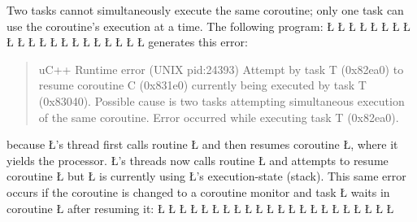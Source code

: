 \documentclass[openright,twoside]{report}
\begin{document}
Two tasks cannot simultaneously execute the same coroutine;
only one task can use the coroutine's execution at a time.
The following program:
\LGinlinefalse\LGbegin\lgrinde
\L{}
\L{\LB{}}
\L{\LB{}}
\L{\LB{}}
\L{}
\L{\LB{}}
\L{\LB{}}
\L{\LB{}}
\L{\LB{\};}}
\endlgrinde\LGend
\LGinlinefalse\LGbegin\lgrinde
\L{}
\L{\LB{}}
\L{\LB{}}
\L{\LB{}}
\L{\LB{}}
\L{}
\L{\LB{}}
\L{\LB{\};}}
\L{}
\L{\LB{}}
\L{\LB{}}
\L{\LB{\}}}
\endlgrinde\LGend
generates this error:
\begin{quote}
\BGfont
uC++ Runtime error (UNIX pid:24393) Attempt by task T (0x82ea0) to resume coroutine C (0x831e0) currently being executed by task T (0x83040).
Possible cause is two tasks attempting simultaneous execution of the same coroutine.
Error occurred while executing task T (0x82ea0).
\end{quote}
because \LGinlinetrue\LGbegin\lgrinde\L{}\endlgrinde\LGend{}'s thread first calls routine \LGinlinetrue\LGbegin\lgrinde\L{}\endlgrinde\LGend{} and then resumes coroutine \LGinlinetrue\LGbegin\lgrinde\L{}\endlgrinde\LGend{}, where it yields the processor.
\LGinlinetrue\LGbegin\lgrinde\L{}\endlgrinde\LGend{}'s threads now calls routine \LGinlinetrue\LGbegin\lgrinde\L{}\endlgrinde\LGend{} and attempts to resume coroutine \LGinlinetrue\LGbegin\lgrinde\L{}\endlgrinde\LGend{} but \LGinlinetrue\LGbegin\lgrinde\L{}\endlgrinde\LGend{} is currently using \LGinlinetrue\LGbegin\lgrinde\L{}\endlgrinde\LGend{}'s execution-state (stack).
This same error occurs if the coroutine is changed to a coroutine monitor and task \LGinlinetrue\LGbegin\lgrinde\L{}\endlgrinde\LGend{} waits in coroutine \LGinlinetrue\LGbegin\lgrinde\L{}\endlgrinde\LGend{} after resuming it:
\LGinlinefalse\LGbegin\lgrinde
\L{}
\L{\LB{}}
\L{\LB{}}
\L{\LB{}}
\L{\LB{}}
\L{}
\L{\LB{}}
\L{\LB{}}
\L{\LB{}}
\L{\LB{\};}}
\endlgrinde\LGend
\LGinlinefalse\LGbegin\lgrinde
\L{}
\L{\LB{}}
\L{\LB{}}
\L{\LB{}}
\L{\LB{}}
\L{}
\L{\LB{}}
\L{\LB{\};}}
\L{}
\L{\LB{}}
\L{\LB{}}
\L{\LB{\}}}
\endlgrinde\LGend
\end{document}
